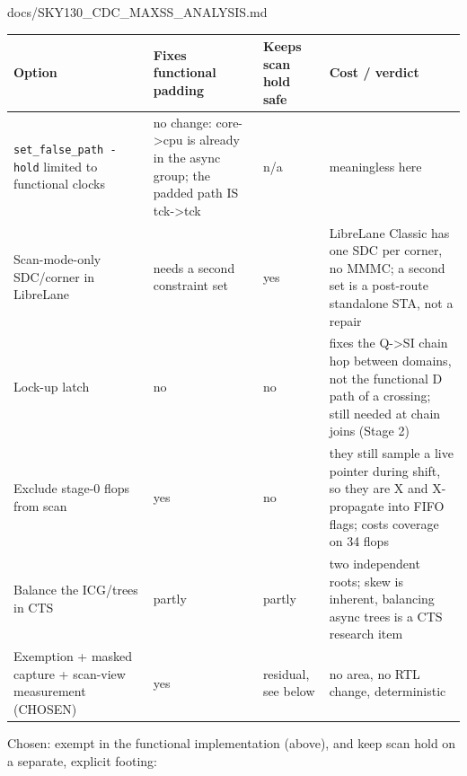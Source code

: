 \begin{relocated}{docs/SKY130_CDC_MAXSS_ANALYSIS.md}
{{
\begin{longtable}[]{@{}
  >{\raggedright\arraybackslash}p{}
  >{\raggedright\arraybackslash}p{}
  >{\raggedright\arraybackslash}p{}
  >{\raggedright\arraybackslash}p{}@{}}
\toprule\noalign{}
\begin{minipage}[b]{\linewidth}\raggedright
Option
\end{minipage} & \begin{minipage}[b]{\linewidth}\raggedright
Fixes functional padding
\end{minipage} & \begin{minipage}[b]{\linewidth}\raggedright
Keeps scan hold safe
\end{minipage} & \begin{minipage}[b]{\linewidth}\raggedright
Cost / verdict
\end{minipage} \\
\midrule\noalign{}
\endhead
\bottomrule\noalign{}
\endlastfoot
\texttt{set\_\allowbreak{}false\_\allowbreak{}path\ -\allowbreak{}hold}
limited to functional clocks & no change: core-\textgreater cpu is
already in the async group; the padded path IS tck-\textgreater tck &
n/a & meaningless here \\
Scan-mode-only SDC/\allowbreak{}corner in LibreLane & needs a second
constraint set & yes & LibreLane Classic has one SDC per corner, no
MMMC; a second set is a post-route standalone STA, not a repair \\
Lock-up latch & no & no & fixes the Q-\textgreater SI chain hop between
domains, not the functional D path of a crossing; still needed at chain
joins (Stage 2) \\
Exclude stage-0 flops from scan & yes & no & they still sample a live
pointer during shift, so they are X and X-propagate into FIFO flags;
costs coverage on 34 flops \\
Balance the ICG/trees in CTS & partly & partly & two independent roots;
skew is inherent, balancing async trees is a CTS research item \\
Exemption + masked capture + scan-view measurement (CHOSEN) & yes &
residual, see below & no area, no RTL change, deterministic \\
\end{longtable}
}

}

Chosen: exempt in the functional implementation (above), and keep scan
hold on a separate, explicit footing:


\end{relocated}
